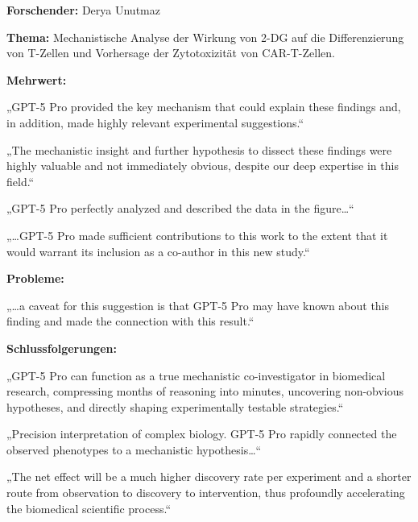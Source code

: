 \documentclass[
  ngerman,
  letterpaper,
  DIV=11]{scrreprt}
\begin{document}
\begin{tcolorbox}[enhanced jigsaw, left=2mm, bottomrule=.15mm, arc=.35mm, rightrule=.15mm, colframe=quarto-callout-note-color-frame, coltitle=black, colback=white, toprule=.15mm, toptitle=1mm, colbacktitle=quarto-callout-note-color!10!white, title=\textcolor{quarto-callout-note-color}{\faInfo}\hspace{0.5em}{Biologie / Immunologische In-vitro-Experimente}, opacitybacktitle=0.6, leftrule=.75mm, bottomtitle=1mm, titlerule=0mm, opacityback=0, breakable]

\textbf{Forschender:} Derya Unutmaz

\textbf{Thema:} Mechanistische Analyse der Wirkung von 2-DG auf die
Differenzierung von T-Zellen und Vorhersage der Zytotoxizität von
CAR-T-Zellen.

\textbf{Mehrwert:}

„GPT-5 Pro provided the key mechanism that could explain these findings
and, in addition, made highly relevant experimental suggestions.``

„The mechanistic insight and further hypothesis to dissect these
findings were highly valuable and not immediately obvious, despite our
deep expertise in this field.``

„GPT-5 Pro perfectly analyzed and described the data in the
figure\ldots``

„\ldots GPT-5 Pro made sufficient contributions to this work to the
extent that it would warrant its inclusion as a co-author in this new
study.``

\textbf{Probleme:}

„\ldots a caveat for this suggestion is that GPT-5 Pro may have known
about this finding and made the connection with this result.``

\textbf{Schlussfolgerungen:}

„GPT-5 Pro can function as a true mechanistic co-investigator in
biomedical research, compressing months of reasoning into minutes,
uncovering non-obvious hypotheses, and directly shaping experimentally
testable strategies.``

„Precision interpretation of complex biology. GPT-5 Pro rapidly
connected the observed phenotypes to a mechanistic hypothesis\ldots``

„The net effect will be a much higher discovery rate per experiment and
a shorter route from observation to discovery to intervention, thus
profoundly accelerating the biomedical scientific process.``

\end{tcolorbox}
\end{document}
